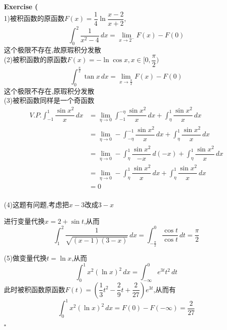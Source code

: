 \documentclass{article}
\newenvironment{exercise}[1]{%
{\textbf{Exercise #1} \\ 
    }
}{
  \hfill $\square$ 
  \par\bigskip 
}
\newcommand{\parameter}[1]{\left(#1\right)}
\begin{document}
\begin{CJK}{UTF8}{gkai}
\begin{exercise}{4}
    (1)被积函数的原函数$F(x) = \dfrac{1}{4}\ln\dfrac{x - 2}{x + 2}$,
    \[\int_{0}^{2}\dfrac{1}{x^2 - 4}\, dx = \lim_{x\to 2
    ^-}F(x) - F(0)\]
    这个极限不存在,故原瑕积分发散\\

    (2)被积函数的原函数$F(x) = -\ln \cos x,x \in [0,\dfrac{\pi}{2})$
    \[\int_{0}^{\frac{\pi}{2}}\tan x \, dx = \lim_{x\to \frac{\pi}{2}} F(x) - F(0)\]
    这个极限不存在,原瑕积分发散\\

    (3)被积函数同样是一个奇函数
    \[
    \begin{aligned}
        V.P. \int_{-1}^{1} \dfrac{\sin x^2}{x}\, dx &= \lim_{\eta \to 0}\int_{-1}^{-\eta}\dfrac{\sin x^2}{x}\, dx +\int_{\eta}^{1} \dfrac{\sin x^2}{x}\, dx\\
        &= \lim_{\eta \to 0} -\int_{-\eta}^{-1}\dfrac{\sin x^2}{x}\, dx +\int_{\eta}^{1} \dfrac{\sin x^2}{x}\, dx\\
        &= \lim_{\eta \to 0} -\int_{\eta}^{1}\dfrac{\sin x^2}{-x}\, d(-x) +\int_{\eta}^{1} \dfrac{\sin x^2}{x}\, dx\\
        &= \lim_{\eta \to 0} -\int_{\eta}^{1}\dfrac{\sin x^2}{x}\, dx +\int_{\eta}^{1} \dfrac{\sin x^2}{x}\, dx\\
        &= 0\\
    \end{aligned}    
    \]

    (4)这题有问题,考虑把$x - 3$改成$3 - x$
    
    进行变量代换$x = 2 + \sin t$,从而
    \[\int_{1}^{2}\dfrac{1}{\sqrt{(x - 1)(3 - x)}}\, dx = \int_{-\frac{\pi}{2}}^{0}\dfrac{\cos t}{\cos t}\, dt = \dfrac{\pi}{2}\]

    (5)做变量代换$t = \ln x$,从而
    \[\int_{0}^{1}x^2 (\ln x)^2\, dx = \int_{-\infty}^{0} e^{3t} t^2 \, dt\]
    此时被积函数原函数$F(t) = \parameter{\dfrac{1}{3}t^2 - \dfrac{2}{9}t + \dfrac{2}{27}}e^{3t}$,从而有
    \[\int_{0}^{1}x^2 (\ln x)^2\, dx = F(0) - F(-\infty) = \dfrac{2}{27}\]
\end{exercise}


\end{CJK}
\end{document}
